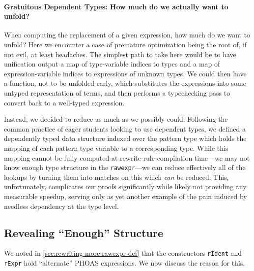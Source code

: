 \paragraph{Gratuitous Dependent Types: How much do we actually want to unfold?}
When computing the replacement of a given expression, how much do we want to unfold?
Here we encounter a case of premature optimization being the root of, if not evil, at least headaches.
The simplest path to take here would be to have unification output a map of type-variable indices to types and a map of expression-variable indices to expressions of unknown types.
We could then have a function, not to be unfolded early, which substitutes the expressions into some untyped representation of terms, and then performs a typechecking pass to convert back to a well-typed expression.

Instead, we decided to reduce as much as we possibly could.
Following the common practice of eager students looking to use dependent types, we defined a dependently typed data structure indexed over the pattern type which holds the mapping of each pattern type variable to a corresponding type.
While this mapping cannot be fully computed at rewrite-rule-compilation time---we may not know enough type structure in the \texttt{rawexpr}---we can reduce effectively all of the lookups by turning them into matches on this which \emph{can} be reduced.
This, unfortunately, complicates our proofs significantly while likely not providing any measurable speedup, serving only as yet another example of the pain induced by needless dependency at the type level.


\subsection{Revealing ``Enough'' Structure}\label{sec:rewriting-more:revealing-enough-structure}
We noted in \autoref{sec:rewriting-more:rawexpr-def} that the constructors \texttt{rIdent} and \texttt{rExpr} hold ``alternate'' PHOAS expressions.
We now discuss the reason for this.

